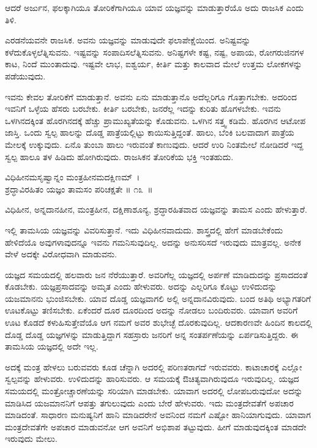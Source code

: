 \begin{artha}
ಆದರೆ ಅರ್ಜುನ, ಫಲಕ್ಕಾಗಿಯೂ ತೋರಿಕೆಗಾಗಿಯೂ ಯಾವ ಯಜ್ಞವನ್ನು ಮಾಡುತ್ತಾರೆಯೊ ಅದು ರಾಜಸಿಕ ಎಂದು ತಿಳಿ.
\end{artha}

ಎರಡನೆಯವನೇ ರಾಜಸಿಕ. ಅವನು ಯಜ್ಞವನ್ನು ಮಾಡುವುದೇ ಫಲಾಪೇಕ್ಷೆಯಿಂದ. ಅನಿಷ್ಟವನ್ನು ಕಳೆದುಕೊಳ್ಳಲೆತ್ನಿಸುವನು. ಇಷ್ಟವನ್ನು ಸಂಪಾದಿಸಲೆತ್ನಿಸುವನು. ಅನಿಷ್ಟಗಳೇ ಕಷ್ಟ, ನಷ್ಟ, ಅಪಾಯ, ರೋಗರುಜಿನಗಳ ಕಾಟ, ನಿಂದೆ ಮುಂತಾದುವು. ಇಷ್ಟವೇ ಲಾಭ, ಐಶ್ವರ್ಯ, ಕೀರ್ತಿ ಮತ್ತು ಕಾಲವಾದ ಮೇಲೆ ಉತ್ತಮ ಲೋಕಗಳನ್ನು ಪಡೆಯುವುದು.

ಇವನು ಕೇವಲ ತೋರಿಕೆಗೆ ಮಾಡುತ್ತಾನೆ. ಅವನು ಏನು ಮಾಡುತ್ತಾನೊ ಅದೆಲ್ಲರಿಗೂ ಗೊತ್ತಾಗಬೇಕು. ಅದರಿಂದ ಇವನಿಗೆ ಒಳ್ಳೆಯ ಹೆಸರು ಬರಬೇಕು. ಕೀರ್ತಿ ಬರಬೇಕು, ಜನರೆಲ್ಲ ಇದನ್ನು ಕುರಿತು ಹೊಗಳಬೇಕು. ಇವನು ಒಳಗಿನದಕ್ಕಿಂತ ಹೊರಗಿನದಕ್ಕೆ ಹೆಚ್ಚು ಪ್ರಾಮುಖ್ಯತೆಯನ್ನು ಕೊಡುವನು. ಒಳಗಿನ ಸತ್ತ್ವ ಕಡಿಮೆ. ಹೊರಗಿನ ಆಟೋಪ ಜಾಸ್ತಿ. ಒಂದು ಸ್ವಲ್ಪ ಹಾಲನ್ನು ದೊಡ್ಡ ಪಾತ್ರೆಯಲ್ಲಿಟ್ಟು ಕಾಯಿಸುತ್ತಿದ್ದಂತೆ. ಹಾಲು, ಬೆಂಕಿ ಬಲವಾದಾಗ ಪಾತ್ರೆಯ ಮೇಲಕ್ಕೆ ಉಕ್ಕುವುದು. ಏನೊ ತುಂಬಾ ಹಾಲು ಇರುವಂತೆ ಕಾಣುವುದು. ಆದರೆ ಉರಿ ನಿಂತಮೇಲೆ ನೋಡಿದರೆ ಇದ್ದ ಸ್ವಲ್ಪ ಹಾಲೂ ತಳ ಹಿಡಿದು ಹೋಗಿರುವುದು. ರಾಜಸಿಕನ ತೋರಿಕೆಯ ಭಕ್ತಿ ಇಂತಹುದು.

\begin{shloka}
ವಿಧಿಹೀನಮಸೃಷ್ವಾನ್ನಂ ಮಂತ್ರಹೀನಮದಕ್ಷಿಣಮ್~।\\ಶ್ರದ್ಧಾವಿರಹಿತಂ ಯಜ್ಞಂ ತಾಮಸಂ ಪರಿಚಕ್ಷತೇ \hfill॥ ೧೩~॥
\end{shloka}

\begin{artha}
ವಿಧಿಹೀನ, ಅನ್ನದಾನಹೀನ, ಮಂತ್ರಹೀನ, ದಕ್ಷಿಣಾಶೂನ್ಯ, ಶ್ರದ್ಧಾರಹಿತವಾದ ಯಜ್ಞವನ್ನು ತಾಮಸ ಎಂದು ಹೇಳುತ್ತಾರೆ.
\end{artha}

ಇಲ್ಲಿ ತಾಮಸಿಯ ಯಜ್ಞವನ್ನು ವಿವರಿಸುತ್ತಾನೆ. ಇದು ವಿಧಿಹೀನವಾದುದು. ಶಾಸ್ತ್ರದಲ್ಲಿ ಹೇಗೆ ಮಾಡಬೇಕೆಂದು ಹೇಳಿದೆಯೊ ಅವುಗಳಾವುದನ್ನೂ ಇವನು ಗಮನಿಸುವುದಿಲ್ಲ. ಅದನ್ನು ಅನುಸರಿಸದೆ ಇರುವುದು ಮಾತ್ರವಲ್ಲ. ಅನೇಕ ವೇಳೆ ಅದಕ್ಕೇ ವಿರೋಧವಾಗಿ ಮಾಡುವನು.

ಯಜ್ಞದ ಸಮಯದಲ್ಲಿ ಹಲವಾರು ಜನ ನೆರೆಯುತ್ತಾರೆ. ಅವರಿಗೆಲ್ಲ ಯಜ್ಞದಲ್ಲಿ ಅರ್ಪಣೆ ಮಾಡಿದುದನ್ನು ಪ್ರಸಾದದಂತೆ ಕೊಡಬೇಕು. ಯಜ್ಞಪ್ರಸಾದವನ್ನು ಅಮೃತ ಎಂದು ಹೇಳುವರು\break. ಅದನ್ನು ಎಲ್ಲರಿಗೂ ಕೊಟ್ಟು ಉಳಿದುದನ್ನು ಯಜಮಾನನು ಭುಂಜಿಸಬೇಕು. ಯಾವ ದೊಡ್ಡ ಯಜ್ಞವಾಗಲಿ ಅಲ್ಲಿ ಅನ್ನದಾನವಿರುವುದು. ಬಂದ ಅತಿಥಿ ಅಭ್ಯಾಗತರಿಗೆ ಊಟಕೊಟ್ಟು ತಣಿಸಬೇಕು. ಏಕೆಂದರೆ ದೂರ ದೂರದಿಂದ ಅದನ್ನು ನೋಡಲು ಬಂದಿರುವರು. ಯಾವಾಗ ಅವರಿಗೆ ಊಟ ಕೊಡದೆ ಕಳುಹಿಸುತ್ತೇವೆಯೊ ಆಗ ನಮಗೆ ಅವರ ಶುಭೇಚ್ಛೆ ದೊರಕುವುದಿಲ್ಲ. ಆದಕಾರಣವೇ ಹಿಂದಿನ ಕಾಲದಲ್ಲಿ ದೊಡ್ಡ ದೊಡ್ಡ ಯಜ್ಞಗಳನ್ನು ಮಾಡುತ್ತಿದ್ದಾಗ ಸಹಸ್ರಾರು ಜನರಿಗೆ ಅನ್ನ ಸಂತರ್ಪಣೆಯನ್ನು ಏರ್ಪಡಿಸುತ್ತಿದ್ದರು. ಈ ತಾಮಸಿಯ ಯಜ್ಞದಲ್ಲಿ ಅದೇ ಇಲ್ಲ.

ಅದಕ್ಕೆ ಮಂತ್ರ ಹೇಳಲು ಬರುವವರು ಕೂಡ ಚೆನ್ನಾಗಿ ಅದರಲ್ಲಿ ಪರಿಣತರಾಗದೆ ಇರುವವರು. ಕಾಟಾಚಾರಕ್ಕೆ ಎಲ್ಲೋ ಸ್ವಲ್ಪವನ್ನು ಹೇಳುವರು. ಉಳಿದುದನ್ನು ಹಾರಿಸುವರು. ಆ ಸಮಯಕ್ಕೆ ಔಚಿತ್ಯವಾಗಿರುವುದೂ ಇರುವುದಿಲ್ಲ. ಯಜ್ಞದ ಸಮಯದಲ್ಲಿ ಮಂತ್ರೋಚ್ಚಾರಣೆಯನ್ನು ಸರಿಯಾಗಿ ಮಾಡಬೇಕು. ಯಾವಾಗ ಅದರಲ್ಲಿ ಲೋಪಬರುವುದೋ ಅದನ್ನು ಮಾಡಿಸಿದ ಯಜಮಾನನಿಗೆ ಆಪತ್ತು ತಗುಲುವುದು ಎಂದು ಬೇರೆ ಹೇಳುವರು. ಇದು ಮಂತ್ರದೇವತೆಗೆ ಅಪಚಾರ ಮಾಡಿದಂತೆ. ಸಾಧಾರಣ ಮನುಷ್ಯನಿಗೆ ಹಾನಿ ಮಾಡಿದರೇನೆ ಅವನಿಂದ ನಮಗೆ ಎಷ್ಟೋ ಹಾನಿಯಾಗುವುದು. ಯಾವಾಗ ಮಂತ್ರದೇವತೆಗೇ ಅಪಚಾರ ಮಾಡುವನೋ ಆಗ ಅವನಿಗೆ ಅಭಿಶಾಪ ತಟ್ಟುವುದು. ಹೀಗೆ ಮಾಡುವುದಕ್ಕಿಂತ ಮಾಡದೇ ಇರುವುದು ಮೇಲು. 

